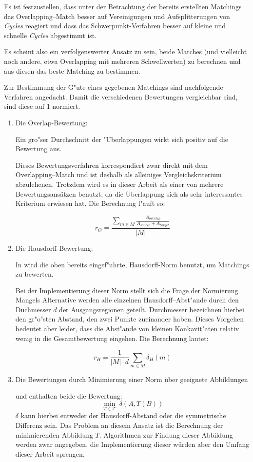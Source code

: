 Es ist festzustellen, dass unter der Betrachtung der bereits erstellten Matchings das Overlapping--Match besser auf Vereinigungen und Aufsplitterungen von \textit{Cycles} reagiert und dass das Schwerpunkt-Verfahren besser auf kleine und schnelle \textit{Cycles} abgestimmt ist. 

Es scheint also ein verfolgenswerter Ansatz zu sein, beide Matches (und vielleicht noch andere, etwa Overlapping mit mehreren Schwellwerten) zu berechnen und aus diesen das beste Matching zu bestimmen. 

Zur Bestimmung der G"ute eines gegebenen Matchings sind nachfolgende Verfahren angedacht. Damit die verschiedenen Bewertungen vergleichbar sind, sind diese auf 1 normiert.

\begin{enumerate}
\item Die Overlap-Bewertung: 

Ein gro"ser Durchschnitt der "Uberlappungen wirkt sich positiv auf die Bewertung aus.

Dieses Bewertungsverfahren korrespondiert zwar direkt mit dem Overlapping--Match und ist deshalb als alleiniges Vergleichskriterium abzulehenen. Trotzdem wird es in dieser Arbeit als einer von mehrere Bewertungsansätzen benutzt, da die Überlappung sich als sehr interessantes Kriterium erwiesen hat. Die Berechnung l"auft so:

$$r_O=\frac{\sum_{m\in M} \frac{A_{overlap}}{A_{source}+A_{target}}}{|M|}$$

\item Die Hausdorff-Bewertung:

In \cite{AAR} wird die oben bereits eingef"uhrte, Hausdorff-Norm benutzt, um Matchings zu bewerten. 

Bei der Implementierung dieser Norm stellt sich die Frage der Normierung. Mangels Alternative werden alle einzelnen Hausdorff--Abst"ande durch den Duchmesser $d$ der Ausgangsregionen geteilt.  Durchmesser bezeichnen hierbei den gr"o"sten Abstand, den zwei Punkte zueinander haben. Dieses Vorgehen bedeutet aber leider, dass die Abst"ande von kleinen Konkavit"aten relativ wenig in die Gesamtbewertung eingehen. Die Berechnung lautet:

$$r_H=\frac{1}{|M| \cdot d}\sum_{m\in M}\delta_H(m)$$

\item Die Bewertungen durch Minimierung einer Norm über geeignete Abbildungen

\cite{AAR} und \cite{AFRW} enthalten beide die Bewertung:
$$\min_{T\in\mathcal{T}}\: \delta(A,T(B))$$
$\delta$ kann hierbei entweder der Hausdorff-Abstand oder die symmetrische Differenz sein. Das Problem an diesem Ansatz ist die Berechnung der minimierenden Abbildung $T$. Algorithmen zur Findung dieser Abbildung werden zwar angegeben, die Implementierung dieser würden aber den Umfang dieser Arbeit sprengen.


\end{enumerate}

